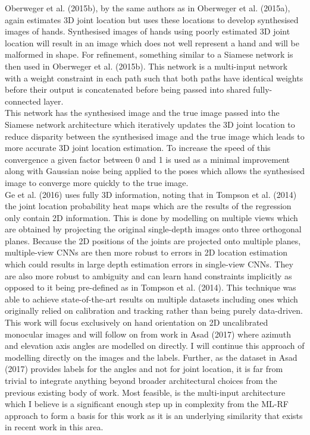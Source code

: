 \documentclass{article}
\begin{document}
Oberweger et al. (2015b), by the same authors as in Oberweger et al. (2015a), again estimates 3D joint location but uses these locations to develop synthesised images of hands. Synthesised images of hands using poorly estimated 3D joint location will result in an image which does not well represent a hand and will be malformed in shape. For refinement, something similar to a Siamese network is then used in Oberweger et al. (2015b). This network is a multi-input network with a weight constraint in each path such that both paths have identical weights before their output is concatenated before being passed into shared fully-connected layer.\\

This network has the synthesised image and the true image passed into the Siamese network architecture which iteratively updates the 3D joint location to reduce disparity between the synthesised image and the true image which leads to more accurate 3D joint location estimation. To increase the speed of this convergence a given factor between 0 and 1 is used as a minimal improvement along with Gaussian noise being applied to the poses which allows the synthesised image to converge more quickly to the true image.\\

Ge et al. (2016) uses fully 3D information, noting that in Tompson et al. (2014) the joint location probability heat maps which are the results of the regression only contain 2D information. This is done by modelling on multiple views which are obtained by projecting the original single-depth images onto three orthogonal planes. Because the 2D positions of the joints are projected onto multiple planes, multiple-view CNNs are then more robust to errors in 2D location estimation which could results in large depth estimation errors in single-view CNNs. They are also more robust to ambiguity and can learn hand constraints implicitly as opposed to it being pre-defined as in Tompson et al. (2014). This technique was able to achieve state-of-the-art results on multiple datasets including ones which originally relied on calibration and tracking rather than being purely data-driven.\\

This work will focus exclusively on hand orientation on 2D uncalibrated monocular images and will follow on from work in Asad (2017) where azimuth and elevation axis angles are modelled on directly. I will continue this approach of modelling directly on the images and the labels. Further, as the dataset in Asad (2017) provides labels for the angles and not for joint location, it is far from trivial to integrate anything beyond broader architectural choices from the previous existing body of work. Most feasible, is the multi-input architecture which I believe is a significant enough step up in complexity from the ML-RF approach to form a basis for this work as it is an underlying similarity that exists in recent work in this area. \\
\end{document}
